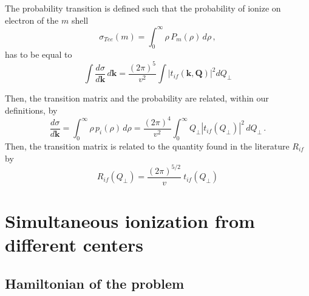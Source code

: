 The probability transition is defined such that the probability of
ionize on electron of the $m$ shell
\[
\sigma_{Tee}(m) = \int_{0}^{\infty} \rho \, P_{m}(\rho) \, d \rho \,
,
\]
has to be equal to
\[
\int \frac{d \sigma}{d \bm{k}} \, d \bm{k} = \frac{(2
\pi)^{5}}{v^{2}} \int |t_{if}(\bm{k},\bm{Q})|^{2} d Q_{\perp}
\]

Then, the transition matrix and the probability are related, within our
definitions, by
\begin{equation}\label{Q:Relat-trans-proba-matri}
\frac{d \sigma}{d \bm{k}} = \int_{0}^{\infty} \rho \, p_{i}(\rho)
\, d \rho = \frac{(2 \pi)^{4}}{v^{2}}\int_{0}^{\infty} Q_{\perp}
|t_{if}(Q_{\perp})|^{2} \, d Q_{\perp} \, .
\end{equation}
%
Then, the transition matrix is related to the quantity found in the
literature $R_{if}$ by
\begin{equation}\label{Q:RelRifTif}
  R_{if}(Q_{\perp}) = \frac{(2 \pi)^{5/2}}{v} \ t_{if}(Q_{\perp})
\end{equation}


\chapter{Simultaneous ionization from different centers}

\section{Hamiltonian of the problem}

